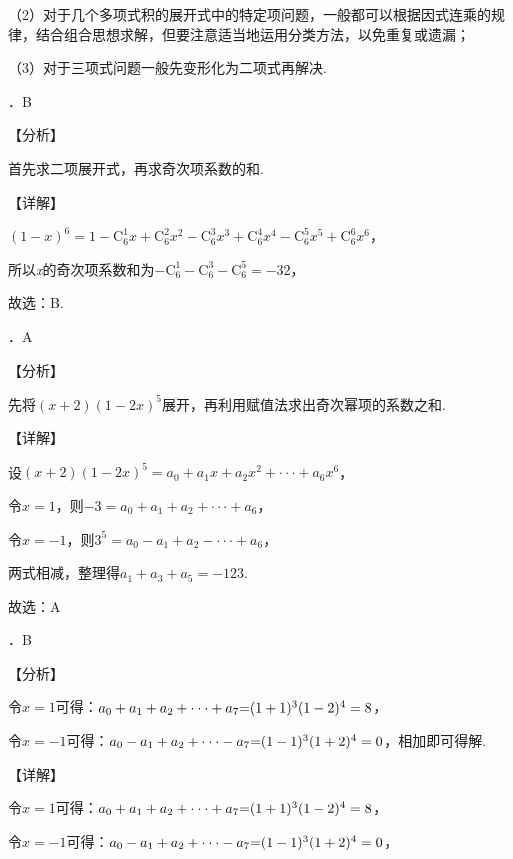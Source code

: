 \noindent （2）对于几个多项式积的展开式中的特定项问题，一般都可以根据因式连乘的规律，结合组合思想求解，但要注意适当地运用分类方法，以免重复或遗漏；

\noindent （3）对于三项式问题一般先变形化为二项式再解决.

．B

\noindent 【分析】

\noindent 首先求二项展开式，再求奇次项系数的和.

\noindent 【详解】

\noindent $\left(1-x\right)^{6} =1-\mathrm C_{6}^{1} x+\mathrm C_{6}^{2} x^{2} -\mathrm C_{6}^{3} x^{3} +\mathrm C_{6}^{4} x^{4} -\mathrm C_{6}^{5} x^{5} +\mathrm C_{6}^{6} x^{6} $，

\noindent 所以\textit{x}的奇次项系数和为$-\mathrm C_{6}^{1} -\mathrm C_{6}^{3} -\mathrm C_{6}^{5} =-32$，

\noindent 故选：B.

．A

\noindent 【分析】

\noindent 先将$\left(x+2\right)\left(1-2x\right)^{5} $展开，再利用赋值法求出奇次幂项的系数之和.

\noindent 【详解】

\noindent 设$\left(x+2\right)\left(1-2x\right)^{5} =a_{0} +a_{1} x+a_{2} x^{2} +\cdot \cdot \cdot +a_{6} x^{6} $，

\noindent 令$x=1$，则$-3=a_{0} +a_{1} +a_{2} +\cdot \cdot \cdot +a_{6} $，

\noindent 令$x=-1$，则$3^{5} =a_{0} -a_{1} +a_{2} -\cdot \cdot \cdot +a_{6} $，

\noindent 两式相减，整理得$a_{1} +a_{3} +a_{5} =-123$.

\noindent 故选：A

．B

\noindent 【分析】

\noindent 令$x=1$可得：$a_{0} +a_{1} +a_{2} +\cdot \cdot \cdot +a_{7} {\rm =}(1+1)^{3} (1-2)^{4} =8$，

\noindent 令$x=-1$可得：$a_{0} -a_{1} +a_{2} +\cdot \cdot \cdot -a_{7} {\rm =}(1-1)^{3} (1+2)^{4} =0$，相加即可得解.

\noindent 【详解】

\noindent 令$x=1$可得：$a_{0} +a_{1} +a_{2} +\cdot \cdot \cdot +a_{7} {\rm =}(1+1)^{3} (1-2)^{4} =8$，

\noindent 令$x=-1$可得：$a_{0} -a_{1} +a_{2} +\cdot \cdot \cdot -a_{7} {\rm =}(1-1)^{3} (1+2)^{4} =0$，

